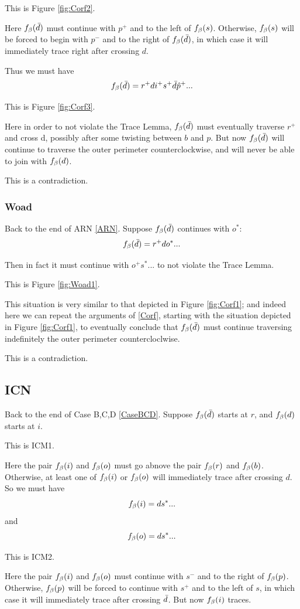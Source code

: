 This is Figure \ref{fig:Corf2}.

Here $f_\beta(\bar{d})$ must continue with $p^+$ and to the left of $f_\beta(s)$. Otherwise, $f_\beta(s)$ will be forced to begin with $p^-$ and to the right of $f_\beta(\bar{d})$, in which case it will immediately trace right after crossing $d$.

Thus we must have
\[
f_\beta(\bar{d}) = r^+ d i^+ s^+ \bar{d} \hat{p}^+...
\]

This is Figure \ref{fig:Corf3}.

Here in order to not violate the Trace Lemma, $f_\beta(\bar{d})$ must eventually traverse $r^+$ and cross d, possibly after some twisting between $b$ and $p$. But now $f_\beta(\bar{d})$ will continue to traverse the outer perimeter counterclockwise, and will never be able to join with $f_\beta(d)$.

This is a contradiction.

\subsubsection{Woad}\label{Woad}
Back to the end of ARN \ref{ARN}. Suppose $f_\beta(\bar{d})$ continues with $o^*$:
\[
f_\beta(\bar{d}) = r^+ d o^*...
\]

Then in fact it must continue with $o^+s^*...$ to not violate the Trace Lemma. 

This is Figure \ref{fig:Woad1}.

This situation is very similar to that depicted in Figure \ref{fig:Corf1}; and indeed here we can repeat the arguments of \ref{Corf}, starting with the situation depicted in Figure \ref{fig:Corf1}, to eventually conclude that $f_\beta(\bar{d})$ must continue traversing indefinitely the outer perimeter countercloclwise.

This is a contradiction.

\subsection{ICN} \label{ICN}
Back to the end of Case B,C,D \ref{CaseBCD}. Suppose $f_\beta(\bar{d})$ starts at $r$, and $f_\beta(d)$ starts at $i$.

This is ICM1.

Here the pair $f_\beta(i)$ and $f_\beta(o)$ must go abnove the pair $f_\beta(r)$ and $f_\beta(b)$. Otherwise, at least one of $f_\beta(i)$ or $f_\beta(o)$ will immediately trace after crossing $d$. So we must have
\[
f_\beta(i) = d s^*...
\]
and
\[
f_\beta(o) = d s^*...
\]

This is ICM2.

Here the pair $f_\beta(i)$ and $f_\beta(o)$ must continue with $s^-$ and to the right of $f_\beta(p)$. Otherwise, $f_\beta(p)$ will be forced to continue with $s^+$ and to the left of $s$, in which case it will immediately trace after crossing $\bar{d}$. But now $f_\beta(i)$ traces.

